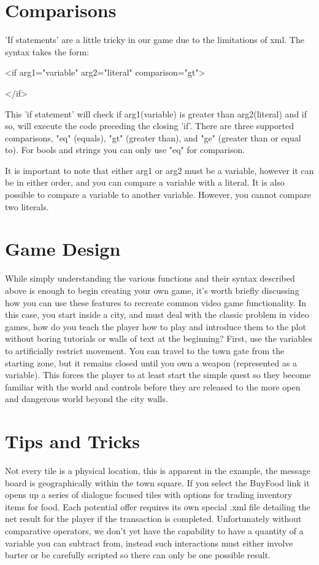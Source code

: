 \documentclass[11pt]{article}
\begin{document}
\section{Comparisons}

'If statements' are a little tricky in our game due to the limitations of xml. The syntax takes the form: 

\textless if arg1="variable" arg2="literal" comparison="gt"\textgreater

\textless /if\textgreater

This 'if statement' will check if arg1(variable) is greater than arg2(literal) and if so, will execute the code preceding the closing 'if'. There are three supported comparisons, "eq" (equals), "gt" (greater than), and "ge" (greater than or equal to). For bools and strings you can only use "eq" for comparison.

It is important to note that either arg1 or arg2 must be a variable, however it can be in either order, and you can compare a variable with a literal. It is also possible to compare a variable to another variable. However, you cannot compare two literals.


\section{Game Design}

While simply understanding the various functions and their syntax described above is enough to begin creating your own game, it's worth briefly discussing how you can use these features to recreate common video game functionality. In this case, you start inside a city, and must deal with the classic problem in video games, how do you teach the player how to play and introduce them to the plot without boring tutorials or walls of text at the beginning? First, use the variables to artificially restrict movement. You can travel to the town gate from the starting zone, but it remains closed until you own a weapon (represented as a variable). This forces the player to at least start the simple quest so they become familiar with the world and controls before they are released to the more open and dangerous world beyond the city walls. 

\section{Tips and Tricks}

Not every tile is a physical location, this is apparent in the example, the message board is geographically within the town square. If you select the BuyFood link it opens up a series of dialogue focused tiles with options for trading inventory items for food. Each potential offer requires its own special .xml file detailing the net result for the player if the transaction is completed. Unfortunately without comparative operators, we don't yet have the capability to have a quantity of a variable you can subtract from, instead such interactions must either involve barter or be carefully scripted so there can only be one possible result.
\end{document}
